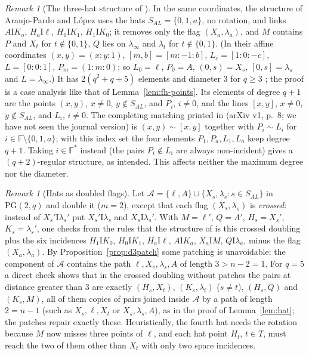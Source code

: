 \documentclass[11pt]{amsart}
\theoremstyle{definition}
\theoremstyle{remark}
\newtheorem{remark}[theorem]{Remark}
\newcommand{\cA}{\mathcal{A}}
\newcommand{\I}{\mathrel{\mathrm{I}}}
\newcommand{\PG}{\mathrm{PG}}
\newcommand{\F}{\mathbb{F}}
\newcommand{\pnt}[3]{({#1}{:}{#2}{:}{#3})}
\newcommand{\lin}[3]{[{#1}{:}{#2}{:}{#3}]}
\newcommand{\lam}{\lambda}
\begin{document}
\begin{remark}[The three-hat structure of {\cite{AL20}}]\label{rem:al}
In the same coordinates, the structure of Araujo-Pardo and L\'opez uses the hats $S_{AL}=\{0,1,a\}$, no rotation, and links $A\I K_a$, $H_a\I\ell$, $H_0\I K_1$, $H_1\I K_0$; it removes only the flag $(X_a,\lam_a)$, and $M$ contains $P$ and $X_t$ for $t\notin\{0,1\}$, $Q$ lies on $\lam_\infty$ and $\lam_t$ for $t\notin\{0,1\}$. (In their affine coordinates $(x,y)=\pnt xy1$, $[m,b]=\lin m{-1}b$, $L_c=\lin10{-c}$, $L=\lin001$, $P_m=\pnt1m0$; so $L_0=\ell$, $P_0=A$, $(0,s)=X_s$, $[0,s]=\lam_s$ and $L=\lam_\infty$.) It has $2(q^2+q+5)$ elements and diameter $3$ for $q\ge3$ \cite{AL20}; the proof is a case analysis like that of Lemma~\ref{lem:fh-points}. Its elements of degree $q+1$ are the points $(x,y)$, $x\ne0$, $y\notin S_{AL}$, and $P_i$, $i\ne0$, and the lines $[x,y]$, $x\ne0$, $y\notin S_{AL}$, and $L_i$, $i\ne0$. The completing matching printed in \cite{AL20} (arXiv v1, p.~8; we have not seen the journal version) is $(x,y)\sim[x,y]$ together with $P_i\sim L_i$ for $i\in\F\setminus\{0,1,a\}$; with this index set the four elements $P_1,P_a,L_1,L_a$ keep degree $q+1$. Taking $i\in\F^*$ instead (the pairs $P_i\notin L_i$ are always non-incident) gives a $(q+2)$-regular structure, as intended. This affects neither the maximum degree nor the diameter.
\end{remark}

\begin{remark}[Hats as doubled flags]\label{rem:al-doubling}
Let $\cA=\{\ell,A\}\cup\{X_s,\lam_s:s\in S_{AL}\}$ in $\PG(2,q)$ and double it ($m=2$), except that each flag $(X_s,\lam_s)$ is \emph{crossed}: instead of $X_s'\I\lam_s'$ put $X_s'\I\lam_s$ and $X_s\I\lam_s'$. With $M=\ell'$, $Q=A'$, $H_s=X_s'$, $K_s=\lam_s'$, one checks from the rules that the structure of \cite{AL20} is this crossed doubling plus the six incidences $H_1\I K_0$, $H_0\I K_1$, $H_a\I\ell$, $A\I K_a$, $X_a\I M$, $Q\I\lam_a$, minus the flag $(X_a,\lam_a)$. By Proposition~\ref{prop:d3patch} some patching is unavoidable: the component of $\cA$ contains the path $\ell,X_s,\lam_s,A$ of length $3>n-2=1$. For $q=5$ a direct check shows that in the crossed doubling without patches the pairs at distance greater than $3$ are exactly $(H_s,X_t)$, $(K_s,\lam_t)$ ($s\ne t$), $(H_s,Q)$ and $(K_s,M)$, all of them copies of pairs joined inside $\cA$ by a path of length $2=n-1$ (such as $X_s,\ell,X_t$ or $X_s,\lam_s,A$), as in the proof of Lemma~\ref{lem:hat}; the patches repair exactly these. Heuristically, the fourth hat needs the rotation because $M$ now misses three points of $\ell$, and each hat point $H_t$, $t\in T$, must reach the two of them other than $X_t$ with only two spare incidences.
\end{remark}
\end{document}
